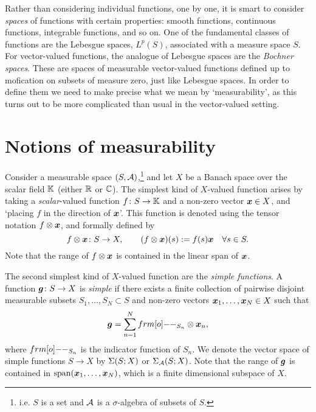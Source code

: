 Rather than considering individual functions, one by one, it is smart to consider \emph{spaces} of functions with certain properties: smooth functions, continuous functions, integrable functions, and so on.
One of the fundamental classes of functions are the Lebesgue spaces, $L^p(S)$, associated with a measure space $S$.
For vector-valued functions, the analogue of Lebesgue spaces are the \emph{Bochner spaces}.
These are spaces of measurable vector-valued functions defined up to mofication on subsets of measure zero, just like Lebesgue spaces.
In order to define them we need to make precise what we mean by `measurability', as this turns out to be more complicated than usual in the vector-valued setting.

\section{Notions of measurability}

Consider a measurable space $(S,\mathcal{A})$,\footnote{i.e. $S$ is a set and $\mathcal{A}$ is a $\sigma$-algebra of subsets of $S$.} and let $X$ be a Banach space over the scalar field $\mathbb{K}$ (either $\mathbb{R}$ or $\mathbb{C}$).
The simplest kind of $X$-valued function arises by taking a \emph{scalar}-valued function $f \colon S \rightarrow \mathbb{K}$ and a non-zero vector $\bm{x} \in X$, and `placing $f$ in the direction of $\bm{x}$'.
This function is denoted using the tensor notation $f \otimes \bm{x}$, and formally defined by
\begin{equation*}
  f \otimes \bm{x} \colon S \rightarrow X, \qquad (f \otimes \bm{x})(s) := f(s)\bm{x} \quad \forall s \in S.
\end{equation*}
Note that the range of $f \otimes \bm{x}$ is contained in the linear span of $\bm{x}$.

The second simplest kind of $X$-valued function are the \emph{simple functions}.
A function $\bm{g} \colon S \rightarrow X$ is \emph{simple} if there exists a finite collection of pairwise disjoint measurable subsets $S_1,\ldots,S_N \subset S$ and non-zero vectors $\bm{x}_1,\ldots,\bm{x}_N \in X$ such that
\begin{equation}\label{eqn:simple-function-standard-form}
  \mb{g} = \sum_{n=1}^N \1_{S_n} \otimes \mb{x}_n ,
\end{equation}
where $\1_{S_n}$ is the indicator function of $S_n$.
We denote the vector space of simple functions $S \to X$ by $\Sigma(S;X)$ or $\Sigma_{\mathcal{A}}(S;X)$.
Note that the range of $\bm{g}$ is contained in $\mathrm{span}(\bm{x}_1,\ldots,\bm{x}_N)$, which is a finite dimensional subspace of $X$.

